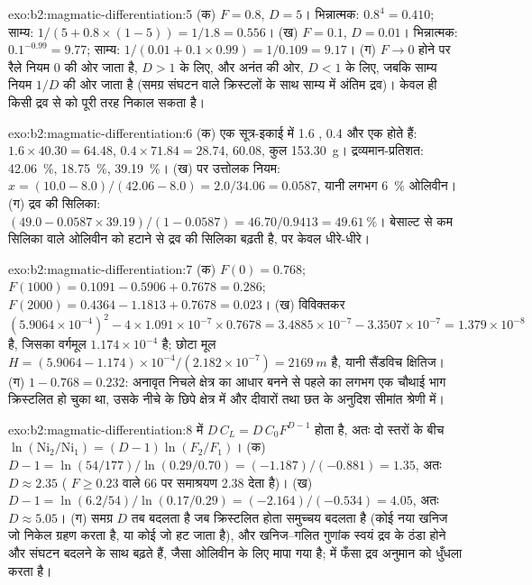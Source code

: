 \begin{solution}{exo:b2:magmatic-differentiation:5}
(क) $F = 0.8$, $D = 5$। भिन्नात्मक: $0.8^{4} = 0.410$; साम्य:
$1/(5 + 0.8\times(1 - 5)) = 1/1.8 = 0.556$। (ख) $F = 0.1$, $D = 0.01$। भिन्नात्मक:
$0.1^{-0.99} = 9.77$; साम्य: $1/(0.01 + 0.1\times0.99) = 1/0.109 = 9.17$।
(ग) $F \to 0$ होने पर रैले नियम $0$ की ओर जाता है, $D > 1$ के लिए, और अनंत की ओर,
$D < 1$ के लिए, जबकि साम्य नियम $1/D$ की ओर जाता है (समग्र संघटन वाले क्रिस्टलों के साथ
साम्य में अंतिम द्रव)। केवल  ही किसी
द्रव से  को पूरी तरह निकाल सकता है।
\end{solution}

\begin{solution}{exo:b2:magmatic-differentiation:6}
(क) एक सूत्र-इकाई में 1.6 , 0.4  और एक  होते हैं: $1.6\times
40.30 = 64.48$, $0.4\times71.84 = 28.74$, 60.08, कुल \qty{153.30}{g}। द्रव्यमान-प्रतिशत:
 \qty{42.06}{\percent},  \qty{18.75}{\percent},
 \qty{39.19}{\percent}। (ख)  पर उत्तोलक नियम: $x = (10.0 - 8.0)/(42.06
- 8.0) = 2.0/34.06 = 0.0587$, यानी लगभग \qty{6}{\percent} ओलिवीन। (ग) द्रव की
सिलिका: $(49.0 - 0.0587\times39.19)/(1 - 0.0587) = 46.70/0.9413 =
\qty{49.61}{\percent}$। बेसाल्ट से कम सिलिका वाले ओलिवीन को हटाने से द्रव की
सिलिका बढ़ती है, पर केवल धीरे-धीरे।
\end{solution}

\begin{solution}{exo:b2:magmatic-differentiation:7}
(क) $F(0) = 0.768$; $F(1000) = 0.1091 - 0.5906 + 0.7678 = 0.286$; $F(2000) = 0.4364
- 1.1813 + 0.7678 = 0.023$। (ख) विविक्तकर $(5.9064\times10^{-4})^2 -
4\times1.091\times10^{-7}\times0.7678 = 3.4885\times10^{-7} - 3.3507\times10^{-7} =
1.379\times10^{-8}$ है, जिसका वर्गमूल $1.174\times10^{-4}$ है; छोटा मूल
$H = (5.9064 - 1.174)\times10^{-4}/(2.182\times10^{-7}) = \qty{2169}{m}$ है, यानी
सैंडविच क्षितिज। (ग) $1 - 0.768 = 0.232$: अनावृत निचले क्षेत्र का आधार बनने से पहले
 का लगभग एक चौथाई भाग क्रिस्टलित हो चुका था, उसके नीचे के छिपे क्षेत्र में
और दीवारों तथा छत के अनुदिश सीमांत श्रेणी में।
\end{solution}

\begin{solution}{exo:b2:magmatic-differentiation:8}
 में $D\,C_L = D\,C_0F^{D-1}$ होता है, अतः दो स्तरों के बीच
$\ln(\mathrm{Ni}_2/\mathrm{Ni}_1) = (D - 1)\ln(F_2/F_1)$। (क) $D - 1 = \ln(54/177)/
\ln(0.29/0.70) = (-1.187)/(-0.881) = 1.35$, अतः $D \approx 2.35$ (
$F \ge 0.23$ वाले 66  पर समाश्रयण 2.38 देता है)। (ख) $D - 1 = \ln(6.2/54)/\ln(0.17/0.29) = (-2.164)/(-0.534)
= 4.05$, अतः $D \approx 5.05$। (ग) समग्र $D$ तब बदलता है जब क्रिस्टलित होता
समुच्चय बदलता है (कोई नया खनिज जो निकेल ग्रहण करता है, या कोई जो हट जाता है), और
खनिज--गलित गुणांक स्वयं द्रव के ठंडा होने और संघटन बदलने के साथ बढ़ते हैं,
जैसा ओलिवीन के लिए मापा गया है;  में फँसा द्रव
अनुमान को धुँधला करता है।
\end{solution}

